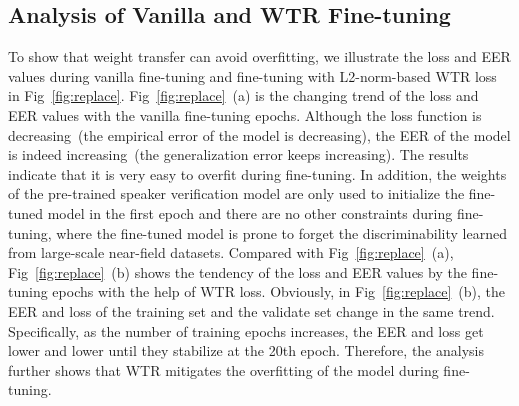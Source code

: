 \documentclass{article}
\begin{document}
\begin{table}[th]
\centering
{} 
\caption{EER/minDCF~(p=0.01) of fine-tuning with different distance-based WTR losses.}
\label{table1}
\vspace{-2em}
\end{table}
\subsection{Analysis of Vanilla and WTR Fine-tuning}
To show that weight transfer can avoid overfitting, we illustrate the loss and EER values during vanilla fine-tuning and fine-tuning with L2-norm-based WTR loss in Fig~\ref{fig:replace}. Fig~\ref{fig:replace}~(a) is the changing trend of the loss and EER values with the vanilla fine-tuning epochs. Although the loss function is decreasing~(the empirical error of the model is decreasing), the EER of the model is indeed increasing~(the generalization error keeps increasing). The results indicate that it is very easy to overfit during fine-tuning. In addition, the weights of the pre-trained speaker verification model are only used to initialize the fine-tuned model in the first epoch and there are no other constraints during fine-tuning, where the fine-tuned model is prone to forget the discriminability learned from large-scale near-field datasets. Compared with Fig~\ref{fig:replace}~(a), Fig~\ref{fig:replace}~(b) shows the tendency of the loss and EER values by the fine-tuning epochs with the help of WTR loss. Obviously, in Fig~\ref{fig:replace}~(b), the EER and loss of the training set and the validate set change in the same trend. Specifically, as the number of training epochs increases, the EER and loss get lower and lower until they stabilize at the 20th epoch. Therefore, the analysis further shows that WTR mitigates the overfitting of the model during fine-tuning.
\end{document}
